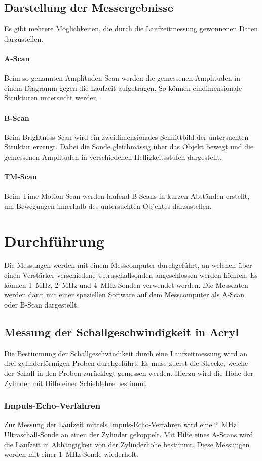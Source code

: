 \documentclass[11pt,ngerman,a4paper]{article}
\begin{document}
\subsection{Darstellung der Messergebnisse}
Es gibt mehrere M\"oglichkeiten, die durch die Laufzeitmessung gewonnenen Daten darzustellen.
\paragraph{A-Scan} Beim so genannten Amplituden-Scan werden die gemessenen Amplituden in einem Diagramm gegen die Laufzeit aufgetragen. So k\"onnen eindimensionale Strukturen untersucht werden. 
\paragraph{B-Scan}
Beim Brightness-Scan wird ein zweidimensionales Schnittbild der untersuchten Struktur erzeugt. Dabei die Sonde gleichm\"assig \"uber das Objekt bewegt und die gemessenen Amplituden in verschiedenen Helligkeitsstufen dargestellt.  
\paragraph{TM-Scan} Beim Time-Motion-Scan werden laufend B-Scans in kurzen Abst\"anden erstellt, um Bewegungen innerhalb des untersuchten Objektes darzustellen.

\section{Durchf\"uhrung }
Die Messungen werden mit einem Messcomputer durchgeführt, an welchen über einen Verstärker verschiedene Ultraschallsonden angeschlossen werden können. Es können \SI{1}{\mega\hertz}, \SI{2}{\mega  \hertz} und \SI{4}{\mega\hertz}-Sonden verwendet werden. Die Messdaten werden dann mit einer speziellen Software auf dem Messcomputer als A-Scan oder B-Scan dargestellt.
\subsection{Messung der Schallgeschwindigkeit in Acryl}
Die Bestimmung der Schallgeschwindikeit durch eine Laufzeitmessung wird an drei zylinderf\"ormigen Proben durchgef\"uhrt. Es muss zuerst die Strecke, welche der Schall in den Proben zur\"ucklegt gemessen werden. Hierzu wird die H\"ohe der Zylinder mit Hilfe einer Schieblehre bestimmt.  
\subsubsection{Impuls-Echo-Verfahren}
Zur Messung der Laufzeit mittels Impuls-Echo-Verfahren wird eine \SI{2}{\mega\hertz} Ultraschall-Sonde an einen der Zylinder gekoppelt. Mit Hilfe eines A-Scans wird die Laufzeit in Abh\"angigkeit von der Zylinderh\"ohe bestimmt. Diese Messungen werden mit einer   \SI{1}{\mega\hertz} Sonde wiederholt. 
\end{document}
